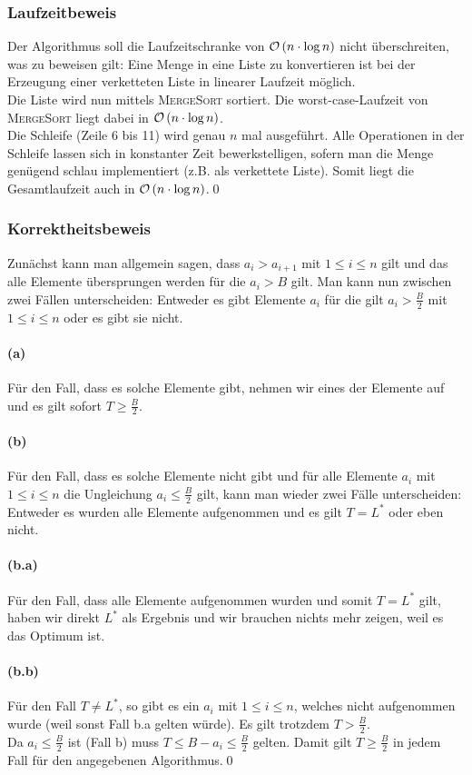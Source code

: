\documentclass[a4paper]{article}
\begin{document}
		\subsubsection*{Laufzeitbeweis}
		Der Algorithmus soll die Laufzeitschranke von $\mathcal{O}\left(n\cdot\log{n}\right)$ nicht überschreiten, was zu beweisen gilt:\n
		Eine Menge in eine Liste zu konvertieren ist bei der Erzeugung einer verketteten Liste in linearer Laufzeit möglich.\\
		Die Liste wird nun mittels \textsc{MergeSort} sortiert. Die worst-case-Laufzeit von \textsc{MergeSort} liegt dabei in $\mathcal{O}\left(n\cdot\log{n}\right)$.\\
		Die Schleife (Zeile 6 bis 11) wird genau $n$ mal ausgeführt. Alle Operationen in der Schleife lassen sich in konstanter Zeit bewerkstelligen, sofern man die Menge genügend schlau implementiert (z.B. als verkettete Liste).\n
		Somit liegt die Gesamtlaufzeit auch in $\mathcal{O}\left(n\cdot\log{n}\right)$.\qed
		\subsubsection*{Korrektheitsbeweis}
		Zunächst kann man allgemein sagen, dass $a_i>a_{i+1}$ mit $1\leq i\leq n$ gilt und das alle Elemente übersprungen werden für die $a_i>B$ gilt.\n
		Man kann nun zwischen zwei Fällen unterscheiden: Entweder es gibt Elemente $a_i$ für die gilt $a_i>\frac{B}{2}$ mit $1\leq i\leq n$ oder es gibt sie nicht.
		\paragraph{(a)}
		Für den Fall, dass es solche Elemente gibt, nehmen wir eines der Elemente auf und es gilt sofort $T\geq\frac{B}{2}$.
		\paragraph{(b)}
		Für den Fall, dass es solche Elemente nicht gibt und für alle Elemente $a_i$ mit $1\leq i\leq n$ die Ungleichung $a_i\leq\frac{B}{2}$ gilt, kann man wieder zwei Fälle unterscheiden: Entweder es wurden alle Elemente aufgenommen und es gilt $T=L^*$ oder eben nicht.
		\paragraph{(b.a)}
		Für den Fall, dass alle Elemente aufgenommen wurden und somit $T=L^*$ gilt, haben wir direkt $L^*$ als Ergebnis und wir brauchen nichts mehr zeigen, weil es das Optimum ist.
		\paragraph{(b.b)}
		Für den Fall $T\neq L^*$, so gibt es ein $a_i$ mit $1\leq i\leq n$, welches nicht aufgenommen wurde (weil sonst Fall b.a gelten würde). Es gilt trotzdem $T>\frac{B}{2}$.\\
		Da $a_i\leq\frac{B}{2}$ ist (Fall b) muss $T\leq B-a_i\leq\frac{B}{2}$ gelten.\n
		Damit gilt $T\geq \frac{B}{2}$ in jedem Fall für den angegebenen Algorithmus.\qed
	\section{}
\end{document}
